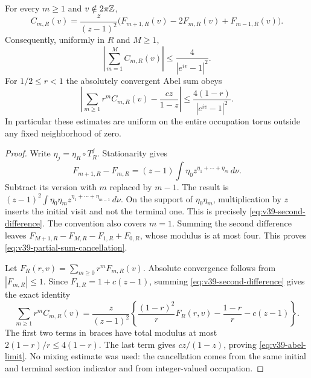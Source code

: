\begin{theorem}
\label{thm:v39-abel-section}
For every $m\ge1$ and $v\notin2\pi\mathbb Z$,
\begin{equation}\label{eq:v39-second-difference}
 C_{m,R}(v)=\frac{z}{(z-1)^2}
       \bigl(F_{m+1,R}(v)-2F_{m,R}(v)+F_{m-1,R}(v)\bigr).
\end{equation}
Consequently, uniformly in $R$ and $M\ge1$,
\begin{equation}\label{eq:v39-partial-sum-cancellation}
 \left|\sum_{m=1}^M C_{m,R}(v)\right|
                         \le\frac4{|e^{iv}-1|^2}.
\end{equation}
For $1/2\le r<1$ the absolutely convergent Abel sum obeys
\begin{equation}\label{eq:v39-abel-limit}
 \left|\sum_{m\ge1}r^m C_{m,R}(v)-\frac{cz}{1-z}\right|
                 \le\frac{4(1-r)}{|e^{iv}-1|^2}.
\end{equation}
In particular these estimates are uniform on the entire occupation
torus outside any fixed neighborhood of zero.
\end{theorem}
\begin{proof}
Write $\eta_j=\eta_R\circ T_R^j$. Stationarity gives
\[
 F_{m+1,R}-F_{m,R}
  =(z-1)\int\eta_0 z^{\eta_1+\cdots+\eta_m}\,d\nu.
\]
Subtract its version with $m$ replaced by $m-1$. The result is
$(z-1)^2\int\eta_0\eta_m z^{\eta_1+\cdots+\eta_{m-1}}\,d\nu$.
On the support of $\eta_0\eta_m$, multiplication by $z$ inserts the
initial visit and not the terminal one. This is precisely
\eqref{eq:v39-second-difference}. The convention also covers $m=1$.
Summing the second difference leaves
$F_{M+1,R}-F_{M,R}-F_{1,R}+F_{0,R}$, whose modulus is at most four.
This proves \eqref{eq:v39-partial-sum-cancellation}.

Let $F_R(r,v)=\sum_{m\ge0}r^m F_{m,R}(v)$. Absolute convergence
follows from $|F_{m,R}|\le1$. Since $F_{1,R}=1+c(z-1)$, summing
\eqref{eq:v39-second-difference} gives the exact identity
\begin{equation}\label{eq:v39-exact-abel}
 \sum_{m\ge1}r^m C_{m,R}(v)
 =\frac{z}{(z-1)^2}\left\{
   \frac{(1-r)^2}{r}F_R(r,v)-\frac{1-r}{r}-c(z-1)\right\}.
\end{equation}
The first two terms in braces have total modulus at most
$2(1-r)/r\le4(1-r)$. The last term gives $cz/(1-z)$, proving
\eqref{eq:v39-abel-limit}. No mixing estimate was used: the cancellation
comes from the same initial and terminal section indicator and from
integer-valued occupation.
\end{proof}

